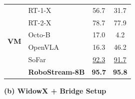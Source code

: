 \begin{table}[t]
\begin{minipage}[htbp]{0.42\linewidth}
{\begin{tabular}{llcc}
                \multirow{6}{*}{\textbf{VM}}
                & RT-1-X~\cite{brohan2022rt}     & 56.7 & 31.7 \\
                & RT-2-X~\cite{zitkovich2023rt}     & 78.7 & 77.9 \\
                & Octo-B~\cite{team2024octo}     & 17.0 & 4.2 \\
                & OpenVLA~\cite{kim2025openvla}    & 16.3 & 46.2 \\
                & SoFar~\cite{qisofar}      & \cellcolor{secondpurple}\underline{92.3} & \cellcolor{secondpurple}\underline{91.7} \\
                & \textbf{RoboStream-8B} & \cellcolor{firstpurple}\textbf{95.7} & \cellcolor{firstpurple}\textbf{95.8} \\
                \bottomrule
            \end{tabular}
        }
    \end{minipage}
    \hfill
    \begin{minipage}[htbp]{0.56\linewidth}
        \centering
        \textbf{(b) WidowX + Bridge Setup}
        \vspace{2pt}


\end{minipage}
\end{table}
